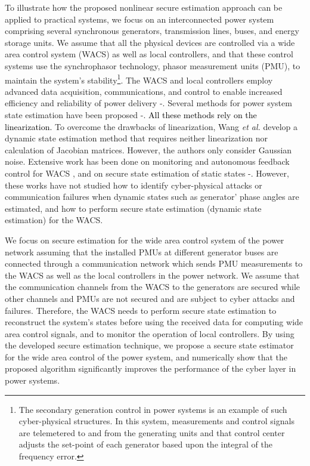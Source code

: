 To illustrate how the proposed nonlinear secure estimation approach can be applied to practical systems, we focus on an interconnected power system comprising several synchronous generators, transmission lines, buses, and energy storage units. We assume that all the physical devices are controlled via a wide area control system (WACS) as well as local controllers, and that these control systems use the synchrophasor technology, phasor measurement units (PMU), to maintain the system's stability\footnote{The secondary generation control in power systems is an example of such cyber-physical structures. In this system, measurements and control signals are telemetered to and from the generating units and that control center adjusts the set-point of each generator based upon the integral of the frequency error.}. The WACS and local controllers employ advanced data acquisition, communications, and control to enable increased efficiency and reliability of power delivery \cite{pmu_w_0}-\!\!\cite{wacs_ref8}. Several methods for power system state estimation have been proposed \cite{ref_v11}-\!\!\cite{ref_v16}. %
\textcolor{black}{All these methods rely on the linearization.} To overcome the drawbacks of linearization, Wang \textit{et al.} \cite{nonlin_est} develop a dynamic state estimation method that requires neither linearization nor calculation of Jacobian matrices. However, the authors only consider Gaussian noise. Extensive work has been done on monitoring and autonomous feedback control for WACS \cite{wacs_ref8}, and on secure state estimation of static states \cite{ref_v1}-\!\!\cite{ref_v2}. However, these works have not studied how to identify cyber-physical attacks or communication failures when dynamic states such as generator' phase angles are estimated, and how to perform secure state estimation (dynamic state estimation) for the WACS.

We focus on secure estimation for the wide area control system of the power network assuming that the installed PMUs at different generator buses are connected through a communication network which sends PMU measurements to the WACS as well as the local controllers in the power network. We assume that the communication channels from the WACS to the generators are secured while other channels and PMUs are not secured and are subject to cyber attacks and failures. Therefore, the WACS needs to perform secure state estimation to reconstruct the system's states before using the received data for computing wide area control signals, and to monitor the operation of local controllers. By using the developed secure estimation technique, we propose a secure state estimator for the wide area control of the power system, and numerically show that the proposed algorithm significantly improves the performance of the cyber layer in power systems.

